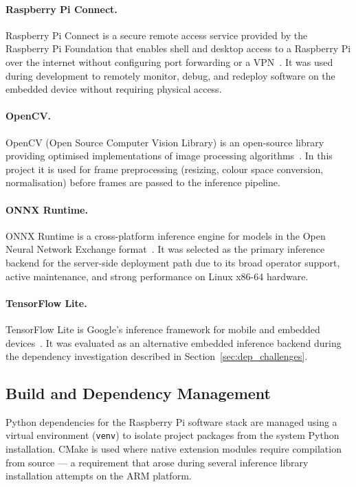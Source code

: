 \paragraph{Raspberry Pi Connect.}
Raspberry Pi Connect is a secure remote access service provided by
the Raspberry Pi Foundation that enables shell and desktop access to
a Raspberry Pi over the internet without configuring port forwarding
or a VPN~\cite{rpconnect2024}. It was used during development to
remotely monitor, debug, and redeploy software on the embedded device
without requiring physical access.
 
\paragraph{OpenCV.}
OpenCV (Open Source Computer Vision Library) is an open-source
library providing optimised implementations of image processing
algorithms~\cite{bradski2000opencv}. In this project it is used for
frame preprocessing (resizing, colour space conversion, normalisation)
before frames are passed to the inference pipeline.
 
\paragraph{ONNX Runtime.}
ONNX Runtime is a cross-platform inference engine for models in the
Open Neural Network Exchange format~\cite{onnxruntime2023}. It was
selected as the primary inference backend for the server-side
deployment path due to its broad operator support, active maintenance,
and strong performance on Linux x86-64 hardware.
 
\paragraph{TensorFlow Lite.}
TensorFlow Lite is Google's inference framework for mobile and
embedded devices~\cite{david2021tensorflow}. It was evaluated as an
alternative embedded inference backend during the dependency
investigation described in Section~\ref{sec:dep_challenges}.
 
\subsection{Build and Dependency Management}
 
Python dependencies for the Raspberry Pi software stack are managed
using a virtual environment (\texttt{venv}) to isolate project
packages from the system Python installation. CMake is used where
native extension modules require compilation from source — a
requirement that arose during several inference library installation
attempts on the ARM platform.
 
